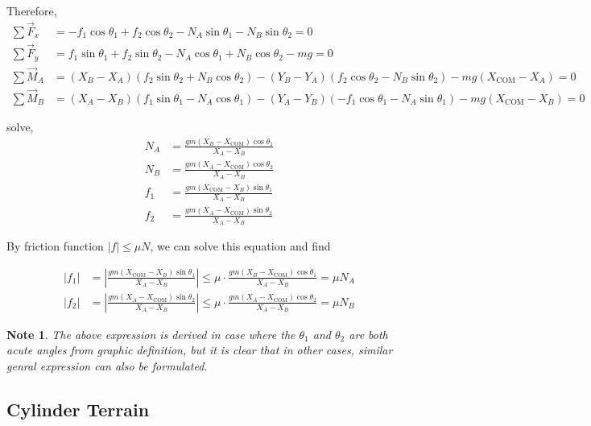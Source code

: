 \documentclass[11pt]{article}
\newtheorem{note}[statement]{Note}
\begin{document}
Therefore,
\begin{align*}
    \sum \vec{F}_x &= -f_1 \cos\theta_1 + f_2 \cos\theta_2 
                     - N_A \sin\theta_1 - N_B \sin\theta_2 = 0 \\
    \sum \vec{F}_y &= f_1 \sin\theta_1 + f_2 \sin\theta_2 
                     - N_A \cos\theta_1 + N_B \cos\theta_2 - mg = 0 \\[1ex]
    \sum \vec{M}_A &= (X_B - X_A)(f_2 \sin\theta_2 + N_B \cos\theta_2)
                     - (Y_B - Y_A)(f_2 \cos\theta_2 - N_B \sin\theta_2)
                     - mg (X_{\text{COM}} - X_A) = 0 \\
    \sum \vec{M}_B &= (X_A - X_B)(f_1 \sin\theta_1 - N_A \cos\theta_1)
                     - (Y_A - Y_B)(-f_1 \cos\theta_1 - N_A \sin\theta_1)
                     - mg (X_{\text{COM}} - X_B) = 0
\end{align*}

solve,
\begin{align*}
    N_A &= \frac{g m (X_B - X_{\text{COM}}) \cos\theta_1}{X_A - X_B} \\[1ex]
    N_B &= \frac{g m (X_A - X_{\text{COM}}) \cos\theta_2}{X_A - X_B} \\[1ex]
    f_1 &= \frac{g m (X_{\text{COM}} - X_B) \sin\theta_1}{X_A - X_B} \\[1ex]
    f_2 &= \frac{g m (X_A - X_{\text{COM}}) \sin\theta_2}{X_A - X_B}
\end{align*}
    
By friction function \(\left| f \right| \leq \mu N\), we can solve this equation and find 

\begin{align*}
    \left| f_1 \right| &= \left| \frac{g m (X_{\text{COM}} - X_B) \sin\theta_1}{X_A - X_B} \right| 
    \leq \mu \cdot \frac{g m (X_B - X_{\text{COM}}) \cos\theta_1}{X_A - X_B} = \mu N_A \\[1.5ex]
    \left| f_2 \right| &= \left| \frac{g m (X_A - X_{\text{COM}}) \sin\theta_2}{X_A - X_B} \right| 
    \leq \mu \cdot \frac{g m (X_A - X_{\text{COM}}) \cos\theta_2}{X_A - X_B} = \mu N_B
\end{align*}

\begin{note}
    The above expression is derived in case where the \(\theta_1\) and \(\theta_2\) are both acute angles from graphic
    definition, but it is clear that in other cases, similar genral expression can also be formulated.
\end{note}
    
\subsection*{Cylinder Terrain}
\end{document}
